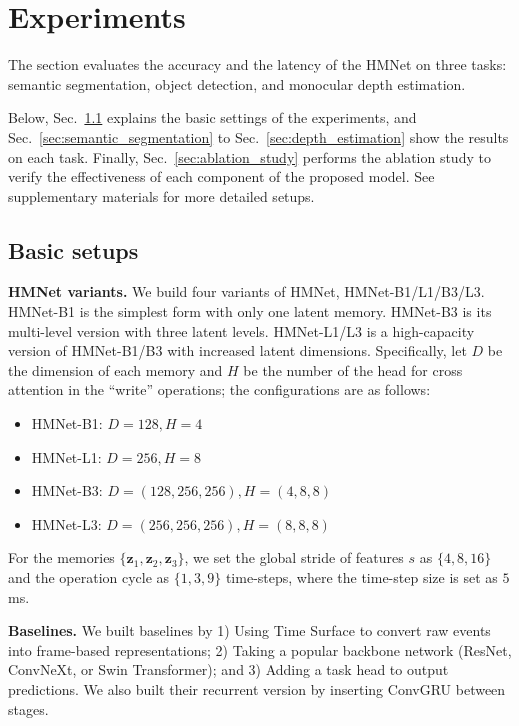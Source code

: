 \section{Experiments}
\label{sec:experiments}
The section evaluates the accuracy and the latency of the HMNet on three tasks: semantic segmentation, object detection, and monocular depth estimation.

Below, Sec.~\ref{sec:basic_setups} explains the basic settings of the experiments, and Sec.~\ref{sec:semantic_segmentation} to Sec.~\ref{sec:depth_estimation} show the results on each task.
Finally, Sec.~\ref{sec:ablation_study} performs the ablation study to verify the effectiveness of each component of the proposed model.
See supplementary materials for more detailed setups.

\figResutSemsegObjdet

\subsection{Basic setups}
\label{sec:basic_setups}

\noindent
\textbf{HMNet variants.}
We build four variants of HMNet, HMNet-B1/L1/B3/L3.
HMNet-B1 is the simplest form with only one latent memory. HMNet-B3 is its multi-level version with three latent levels. HMNet-L1/L3 is a high-capacity version of HMNet-B1/B3 with increased latent dimensions. Specifically, let $D$ be the dimension of each memory and $H$ be the number of the head for cross attention in the ``write'' operations; the configurations are as follows:
\begin{itemize}
\setlength{\parskip}{-1mm}
\setlength{\itemsep}{-3mm}
\item HMNet-B1: $D=128, H=4$ \\
\item HMNet-L1: $D=256, H=8$ \\
\item HMNet-B3: $D=(128,256,256), H=(4,8,8)$ \\
\item HMNet-L3: $D=(256,256,256), H=(8,8,8)$ \\
\end{itemize}
\vspace{-0.5cm}
For the memories $\{\bm{z}_1, \bm{z}_2, \bm{z}_3\}$, we set the global stride of features $s$ as $\{4,8,16\}$
and the operation cycle as $\{1,3,9\}$ time-steps, where the time-step size is set as $5$ms.

\vspace{0.1cm}
\noindent
\textbf{Baselines.}
We built baselines by 1) Using Time Surface to convert raw events into frame-based representations; 2) Taking a popular backbone network (ResNet, ConvNeXt, or Swin Transformer); and 3) Adding a task head to output predictions.
We also built their recurrent version by inserting ConvGRU \cite{Ballas2016} between stages.

